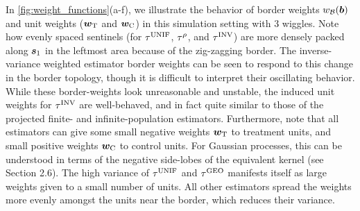 \documentclass[letter,12pt]{article}
\begin{document}
        In \autoref{fig:weight_functions}(a-f), we illustrate the behavior of border weights \(w_{\mathcal{B}}(\bm{b})\) and unit weights (\(\bm{w}_{\mathrm{T}}\) and \(\bm{w}_{\mathrm{C}}\)) in this simulation setting with 3 wiggles.
Note how evenly spaced sentinels (for \(\tau^{\mathrm{UNIF}}\), \(\tau^{\rho}\), and \(\tau^{\mathrm{INV}}\)) are more densely packed along \(\bm{s}_1\) in the leftmost area because of the zig-zagging border.
The inverse-variance weighted estimator border weights can be seen to respond to this change in the border topology, though it is difficult to interpret their oscillating behavior.
While these border-weights look unreasonable and unstable, the induced unit weights for \(\tau^{\mathrm{INV}}\) are well-behaved, and in fact quite similar to those of the projected finite- and infinite-population estimators.
Furthermore, note that all estimators can give some small negative weights \(\bm{w}_{\mathrm{T}}\) to treatment units, and small positive weights \(\bm{w}_{\mathrm{C}}\) to control units.
For Gaussian processes, this can be understood in terms of the negative side-lobes of the equivalent kernel (see \cite{rasmussen2006gaussian} Section 2.6).
The high variance of \(\tau^{\mathrm{UNIF}}\) and \(\tau^{\mathrm{GEO}}\) manifests itself as large weights given to a small number of units.
All other estimators spread the weights more evenly amongst the units near the border, which reduces their variance.
    
\end{document}
